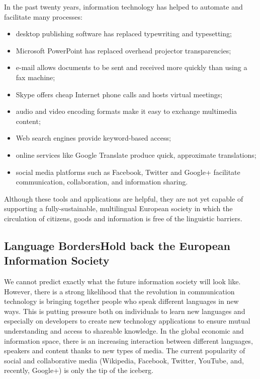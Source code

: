 \begin{multicols}{2}
In the past twenty years, information technology has helped to automate and facilitate many processes:

\begin{itemize}
\item desktop publishing software has replaced typewriting and typesetting;
\item Microsoft PowerPoint has replaced overhead projector transparencies;
\item e-mail allows documents to be sent and received more quickly than using a fax machine;
\item Skype offers cheap Internet phone calls and hosts virtual meetings;
\item audio and video encoding formats make it easy to exchange multimedia content;
\item Web search engines provide keyword-based access;
\item online services like Google Translate produce quick, approximate translations;
\item social media platforms such as Facebook, Twitter and Google+ facilitate communication, collaboration, and information sharing.
\end{itemize}

Although these tools and applications are helpful, they are not yet capable of supporting a fully-sustainable, multilingual European society in which the circulation of citizens, goods and information is free of the linguistic barriers.

\subsection[Language Borders Hold back the European Information Society]{Language Borders\newline Hold back the European Information Society}

We cannot predict exactly what the future information society will look like. However, there is a strong likelihood that the revolution in communication technology is bringing together people who speak different languages in new ways. This is putting pressure both on individuals to learn new languages and especially on developers to create new technology applications to ensure mutual understanding and access to shareable knowledge. In the global economic and information space, there is an increasing interaction between different languages, speakers and content thanks to new types of media. The current popularity of social and collaborative media (Wikipedia, Facebook, Twitter, YouTube, and, recently, Google+) is only the tip of the iceberg.


\end{multicols}
